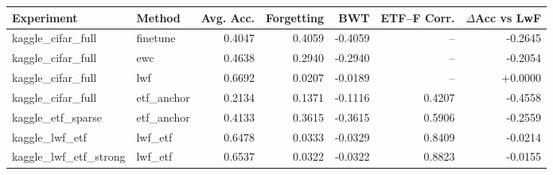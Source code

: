 \begin{tabular}{llrrrrr}
\hline
Experiment & Method & Avg. Acc. & Forgetting & BWT & ETF--F Corr. & $\Delta$Acc vs LwF \\ 
\hline
kaggle_cifar_full & finetune & 0.4047 & 0.4059 & -0.4059 & -- & -0.2645 \\ 
kaggle_cifar_full & ewc & 0.4638 & 0.2940 & -0.2940 & -- & -0.2054 \\ 
kaggle_cifar_full & lwf & 0.6692 & 0.0207 & -0.0189 & -- & +0.0000 \\ 
kaggle_cifar_full & etf_anchor & 0.2134 & 0.1371 & -0.1116 & 0.4207 & -0.4558 \\ 
kaggle_etf_sparse & etf_anchor & 0.4133 & 0.3615 & -0.3615 & 0.5906 & -0.2559 \\ 
kaggle_lwf_etf & lwf_etf & 0.6478 & 0.0333 & -0.0329 & 0.8409 & -0.0214 \\ 
kaggle_lwf_etf_strong & lwf_etf & 0.6537 & 0.0322 & -0.0322 & 0.8823 & -0.0155 \\ 
\hline
\end{tabular}
